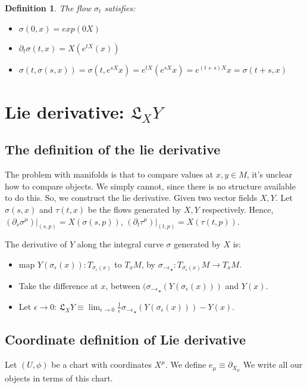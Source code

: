 \documentclass[11pt]{book}
\newcommand{\Lie}{\ensuremath{\mathfrak{L}}}
\newcommand{\pushforward}[1]{\ensuremath{{#1}_{\star}}}
\newcommand{\pushfwd}[1]{\pushforward{#1}}
\newcommand{\pf}[1]{\pushfwd{#1}}
\newtheorem{definition}{Definition}
\begin{document}
\begin{definition}
    The flow $\sigma_t$ satisfies:
    \begin{itemize}
        \item $\sigma(0, x) = exp(0X)$
        \item $\partial_t \sigma(t, x) = X(e^{tX}(x))$
        \item $\sigma(t, \sigma(s, x)) = \sigma(t, e^{sX} x) = e^{tX} (e^{sX} x) = e^{(t+s)X} x = \sigma(t + s, x)$
    \end{itemize}
\end{definition}

\chapter{Lie derivative: $\Lie_X Y$}
\section{The definition of the lie derivative}
The problem with manifolds is that to compare values at $x, y \in M$, it's
unclear how to compare objects. We simply cannot, since there is no structure
available to do this. So, we construct the lie derivative. Given two vector
fields $X, Y$. Let $\sigma(s, x)$ and $\tau(t, x)$ be the flows generated
by $X, Y$ respectively. Hence, $(\partial_s \sigma^\mu)|_{(s, p)} = X(\sigma(s, p))$,
$(\partial_t \tau^\mu)|_{(t, p)} = X(\tau(t, p))$.

The derivative of $Y$ along the integral curve $\sigma$ generated by $X$ is:
\begin{itemize}
    \item map $Y(\sigma_\epsilon(x)): T_{\sigma_\epsilon(x)}$ to $T_x M$,
    by $\pf{\sigma_{-\epsilon}}: T_{\sigma_{\epsilon}(x)}M \rightarrow T_x M$.
    \item Take the difference at $x$, between $(\pf{\sigma_{-\epsilon}}(Y(\sigma_\epsilon(x)))$ and $Y(x)$.
    \item Let $\epsilon \to 0$: 
        $\Lie_X Y \equiv \lim_{\epsilon \to 0} \frac{1}{\epsilon} \pushforward{\sigma_{-\epsilon}}(Y(\sigma_\epsilon(x))) - Y(x)$.
\end{itemize}

\section{Coordinate definition of Lie derivative}

Let $(U, \phi)$ be a chart with coordinates $X^\mu$. We define $e_\mu \equiv \partial_{X_\mu}$ We write
all our objects in terms of this chart.
\end{document}
